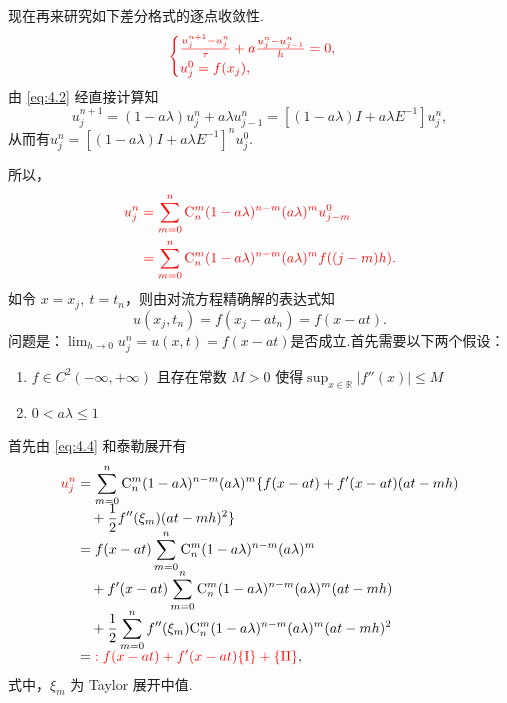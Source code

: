 \begin{instance}
    现在再来研究如下差分格式的逐点收敛性.
\begin{equation}
    {\color{red}
    \begin{cases}
        \frac{u_j^{n+1} - u_j^n}{\tau} + a \frac{u_j^n - u_{j-1}^n}{h} = 0, \\
        u_j^0 = f(x_j),
    \end{cases}
    } \label{eq:4.2}
\end{equation}
\noindent{}
由 \eqref{eq:4.2} 经直接计算知
\[ u_j^{n+1} = (1 - a\lambda)u_j^n + a\lambda u_{j-1}^n = [(1 - a\lambda)I + a\lambda E^{-1}]u_j^n, \]
从而有$u_j^n = [(1 - a\lambda)I + a\lambda E^{-1}]^n u_j^0.$\par
所以，
\begin{equation}
    {\color{red}
    \begin{aligned}
        u_j^n &= \sum_{m=0}^n \mathrm{C}_n^m (1 - a\lambda)^{n-m} (a\lambda)^m u_{j-m}^0 \\
        &= \sum_{m=0}^n \mathrm{C}_n^m (1 - a\lambda)^{n-m} (a\lambda)^m f((j-m)h).
    \end{aligned}
    } \label{eq:4.4}
\end{equation}
\noindent{}
如令 $x = x_j, \ t = t_n$，则由对流方程精确解的表达式知
\[ u(x_j, t_n) = f(x_j - a t_n) = f(x - at). \]
问题是：$\lim_{h\to 0}u_j^n=u(x,t)=f(x-at)$是否成立.首先需要以下两个假设：
\begin{enumerate}[(1)]
    \item $f \in C^2(-\infty, +\infty)$ 且存在常数 $M > 0$ 使得$\sup_{x \in \mathbb{R}} |f''(x)| \leq M$
    \item $0<a\lambda\leq 1$
\end{enumerate}


首先由 \eqref{eq:4.4} 和泰勒展开有
\begin{equation}
    \setjot[-2]\begin{aligned}
        {\color{red} u_j^n} &= \sum_{m=0}^n \mathrm{C}_n^m (1 - a\lambda)^{n-m} (a\lambda)^m \{ f(x - at) + f'(x - at)(at - mh) \\
        &\quad + \frac{1}{2} f''(\xi_m)(at - mh)^2 \} \\
        &= f(x - at) \sum_{m=0}^n \mathrm{C}_n^m (1 - a\lambda)^{n-m} (a\lambda)^m \\
        &\quad + f'(x - at) \sum_{m=0}^n \mathrm{C}_n^m (1 - a\lambda)^{n-m} (a\lambda)^m (at - mh) \\
        &\quad + \frac{1}{2} \sum_{m=0}^n f''(\xi_m) \mathrm{C}_n^m (1 - a\lambda)^{n-m} (a\lambda)^m (at - mh)^2 \\
        &= {\color{red} : f(x - at) + f'(x - at)\{\mathrm{I}\} + \{\mathrm{II}\} },
    \end{aligned} \label{eq:4.5}
\end{equation}
式中，$\xi_m$ 为 Taylor 展开中值.


\end{instance}
